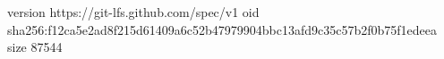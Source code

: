 version https://git-lfs.github.com/spec/v1
oid sha256:f12ca5e2ad8f215d61409a6c52b47979904bbc13afd9c35c57b2f0b75f1edeea
size 87544
